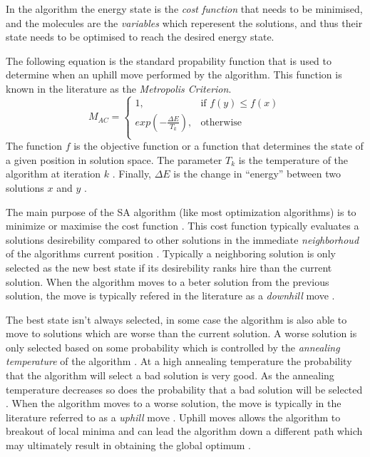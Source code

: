 In the algorithm the energy state is the \emph{cost function} that needs to be minimised, and the molecules are the \emph{variables} which reperesent the solutions, and thus their state needs to be optimised to reach the desired energy state.

The following equation is the standard propability function that is used to determine when an uphill move performed by the algorithm. This function is known in the literature as the \emph{Metropolis Criterion}. 
\begin{equation}
	M_{AC} =
	\begin{cases}
	1, &\text{if $f(y) \leq f(x)$}\\
	exp(-\frac{\Delta E}{T_k}), &\text{otherwise}\\
	\end{cases}
\end{equation}
The function $f$ is the objective function or a function that determines the state of a given position in solution space\cite{EcoEquilSA}. The parameter $T_k$ is the temperature of the algorithm at iteration $k$ \cite{EcoEquilSA}. Finally, $\Delta E$ is the change in ``energy'' between two solutions $x$ and $y$ \cite{EcoEquilSA}.


The main purpose of the SA algorithm (like most optimization algorithms) is to minimize or maximise the cost function \cite{SASingleMultiObj}. This cost function typically evaluates a solutions desirebility compared to other solutions in the immediate \emph{neighborhoud} of the algorithms current position \cite{TheoPraticalSA}. Typically a neighboring solution is only selected as the new best state if its desirebility ranks hire than the current solution. When the algorithm moves to a beter solution from the previous solution, the move is typically refered in the literature as a \emph{downhill} move \cite{CurveFittingSA}.

The best state isn't always selected, in some case the algorithm is also able to move to solutions which are worse than the current solution. A worse solution is only selected based on some probability which is controlled by the \emph{annealing temperature} of the algorithm \cite{TheoPraticalSA}. At a high annealing temperature the probability that the algorithm will select a bad solution is very good. As the annealing temperature decreases so does the probability that a bad solution will be selected \cite{CurveFittingSA}. When the algorithm moves to a worse solution, the move is typically in the literature referred to as a \emph{uphill} move \cite{CurveFittingSA}. Uphill moves allows the algorithm to breakout of local minima and can lead the algorithm down a different path which may ultimately result in obtaining the global optimum \cite{SASingleMultiObj}. 

